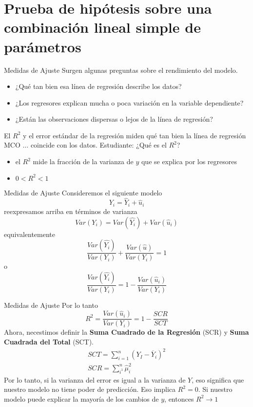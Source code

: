 \section{Prueba de hipótesis sobre una combinación lineal simple de parámetros}

\begin{frame}{Medidas de Ajuste}
	Surgen algunas preguntas sobre el rendimiento del modelo.
		\begin{itemize}
			\item ¿Qué tan bien esa línea de regresión describe los datos?
			\item ¿Los regresores explican mucha o poca variación en la variable dependiente?
			\item ¿Están las observaciones dispersas o lejos de la línea de regresión?
		\end{itemize}
	El $R^2$ y el error estándar de la regresión miden qué tan bien la línea de regresión MCO $\ldots$ coincide con los datos. Estudiante: ¿Qué es el $R^2$?
		\begin{itemize}
			\item el $R^2$ mide la fracción de la varianza de $y$ que se explica por los regresores
			\item $0 < R^2 <1$
		\end{itemize}
\end{frame}
\begin{frame}{Medidas de Ajuste}
	Consideremos el siguiente modelo
		$$Y_i = \widehat{Y}_i + \widehat{u}_i$$
	reexpresamos arriba en términos de varianza
		$$Var(Y_i) = Var	(\widehat{Y_i}) + Var(\widehat{u}_i)$$
	equivalentemente
		$$\frac{Var(\widehat{Y_i})}{Var(Y_i)} + \frac{Var(\widehat{u})}{Var(Y_i)} = 1$$
	o
		$$\frac{Var(\widehat{Y_i})}{Var(Y_i)} = 1 - \frac{Var(\widehat{u}_i)}{Var(Y_i)}$$
\end{frame}
\begin{frame}{Medidas de Ajuste}
	Por lo tanto
		$$R^{2} = \frac{Var(\widehat{u}_i)}{Var(Y_i)} = 1 - \frac{SCR}{SCT}$$
	Ahora, necestimos definir la \textbf{Suma Cuadrado de la Regresión} (SCR) y \textbf{Suma Cuadrada del Total} (SCT).
		\begin{gather}
			SCT = \sum_{i=1}^{n}(Y_I-\overline{Y}_i)^2 \tag{SCT}\\
			SCR = \sum_{i^1}^{n}\widehat{\mu}_i^{2} \tag{SCR}
		\end{gather}
	Por lo tanto, si la varianza del error es igual a la varianza de $Y$, eso significa que nuestro modelo no tiene poder de predicción. Eso implica $R^{2} = 0$. Si nuestro modelo puede explicar la mayoría de los cambios de $y$, entonces $R^{2} \rightarrow 1$
\end{frame}
